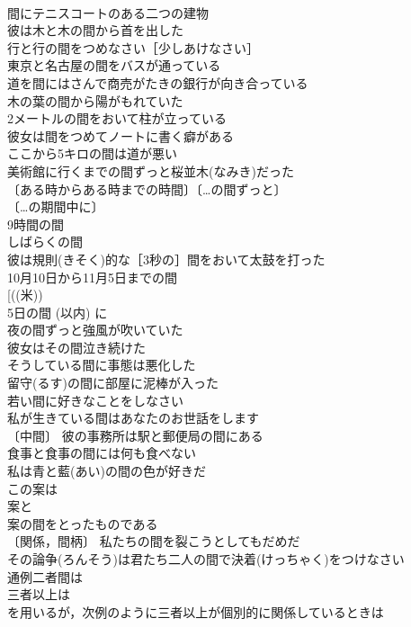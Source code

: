 \documentclass[8pt]{extreport}
\begin{document}
\begin{CJK}{UTF8}{min}
\\	間にテニスコートのある二つの建物 
\\	彼は木と木の間から首を出した 
\\	行と行の間をつめなさい［少しあけなさい］ 
\\	東京と名古屋の間をバスが通っている 
\\	道を間にはさんで商売がたきの銀行が向き合っている 
\\	木の葉の間から陽がもれていた 
\\	2メートルの間をおいて柱が立っている 
\\	彼女は間をつめてノートに書く癖がある 
\\	ここから5キロの間は道が悪い 
\\	美術館に行くまでの間ずっと桜並木(なみき)だった 
\\	〔ある時からある時までの時間〕〔…の間ずっと〕
\\	〔…の期間中に〕
\\	9時間の間 
\\	しばらくの間 
\\	彼は規則(きそく)的な［3秒の］間をおいて太鼓を打った 
\\	10月10日から11月5日までの間 
\\	[((米))
\\	5日の間 (以内) に 
\\	夜の間ずっと強風が吹いていた 
\\	彼女はその間泣き続けた 
\\	そうしている間に事態は悪化した 
\\	留守(るす)の間に部屋に泥棒が入った 
\\	若い間に好きなことをしなさい 
\\	私が生きている間はあなたのお世話をします 
\\	〔中間〕 彼の事務所は駅と郵便局の間にある 
\\	食事と食事の間には何も食べない 
\\	私は青と藍(あい)の間の色が好きだ 
\\	この案は
\\	案と
\\	案の間をとったものである 
\\	〔関係，間柄〕 私たちの間を裂こうとしてもだめだ 
\\	その論争(ろんそう)は君たち二人の間で決着(けっちゃく)をつけなさい 
\\	通例二者間は
\\	三者以上は
\\	を用いるが，次例のように三者以上が個別的に関係しているときは

\end{CJK}
\end{document}

